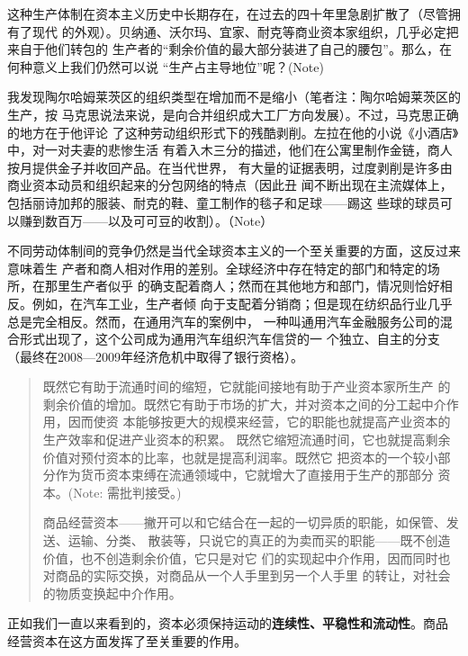 这种生产体制在资本主义历史中长期存在，在过去的四十年里急剧扩散了（尽管拥有了现代
的外观）。贝纳通、沃尔玛、宜家、耐克等商业资本家组织，几乎必定把来自于他们转包的
生产者的“剩余价值的最大部分装进了自己的腰包”。那么，在何种意义上我们仍然可以说
“生产占主导地位”呢？(Note)

我发现陶尔哈姆莱茨区的组织类型在增加而不是缩小（笔者注：陶尔哈姆莱茨区的生产，按
马克思说法来说，是向合并组织成大工厂方向发展）。不过，马克思正确的地方在于他评论
了这种劳动组织形式下的残酷剥削。左拉在他的小说《小酒店》中，对一对夫妻的悲惨生活
有着入木三分的描述，他们在公寓里制作金链，商人按月提供金子并收回产品。在当代世界，
有大量的证据表明，过度剥削是许多由商业资本动员和组织起来的分包网络的特点（因此丑
闻不断出现在主流媒体上，包括丽诗加邦的服装、耐克的鞋、童工制作的毯子和足球——踢这
些球的球员可以赚到数百万——以及可可豆的收割）。（Note）

不同劳动体制间的竞争仍然是当代全球资本主义的一个至关重要的方面，这反过来意味着生
产者和商人相对作用的差别。全球经济中存在特定的部门和特定的场所，在那里生产者似乎
的确支配着商人；然而在其他地方和部门，情况则恰好相反。例如，在汽车工业，生产者倾
向于支配着分销商；但是现在纺织品行业几乎总是完全相反。然而，在通用汽车的案例中，
一种叫通用汽车金融服务公司的混合形式出现了，这个公司成为通用汽车组织汽车信贷的一
个独立、自主的分支（最终在2008—2009年经济危机中取得了银行资格）。

\begin{quotation}既然它有助于流通时间的缩短，它就能间接地有助于产业资本家所生产
的剩余价值的增加。既然它有助于市场的扩大，并对资本之间的分工起中介作用，因而使资
本能够按更大的规模来经营，它的职能也就提高产业资本的生产效率和促进产业资本的积累。
既然它缩短流通时间，它也就提高剩余价值对预付资本的比率，也就是提高利润率。既然它
把资本的一个较小部分作为货币资本束缚在流通领域中，它就增大了直接用于生产的那部分
资本。(Note: 需批判接受。)

商品经营资本——撇开可以和它结合在一起的一切异质的职能，如保管、发送、运输、分类、
散装等，只说它的真正的为卖而买的职能——既不创造价值，也不创造剩余价值，它只是对它
们的实现起中介作用，因而同时也对商品的实际交换，对商品从一个人手里到另一个人手里
的转让，对社会的物质变换起中介作用。

\end{quotation}

正如我们一直以来看到的，资本必须保持运动的\textbf{连续性、平稳性和流动性}。商品
经营资本在这方面发挥了至关重要的作用。

